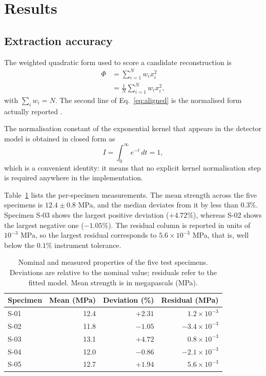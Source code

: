 \documentclass[10pt,twocolumn,a4paper]{article}
\begin{document}
\section{Results}
\label{sec:results}

\subsection{Extraction accuracy}

The weighted quadratic form used to score a candidate reconstruction is
\begin{equation}
\label{eq:aligned}
\begin{aligned}
\Phi &= \sum_{i=1}^{N} w_i x_i^{2} \\
     &= \frac{1}{N} \sum_{i=1}^{N} w_i x_i^{2} ,
\end{aligned}
\end{equation}
with $\sum_i w_i = N$. The second line of Eq.~\eqref{eq:aligned} is the
normalised form actually reported \cite{ref5}.

The normalisation constant of the exponential kernel that appears in the
detector model is obtained in closed form as
\begin{equation}
\label{eq:integral}
I = \int_{0}^{\infty} e^{-t}\,dt = 1 ,
\end{equation}
which is a convenient identity: it means that no explicit kernel
normalisation step is required anywhere in the implementation.

Table~\ref{tab:summary} lists the per-specimen measurements. The mean
strength across the five specimens is $12.4 \pm 0.8$ MPa, and the median
deviates from it by less than $0.3\%$. Specimen S-03 shows the largest
positive deviation ($+4.72\%$), whereas S-02 shows the largest negative one
($-1.05\%$). The residual column is reported in units of $10^{-3}$ MPa, so
the largest residual corresponds to $5.6 \times 10^{-3}$ MPa, that is, well
below the $0.1\%$ instrument tolerance.

\begin{table}[t]
\centering
\caption{Nominal and measured properties of the five test specimens.
Deviations are relative to the nominal value; residuals refer to the fitted
model. Mean strength is in megapascals (MPa).}
\label{tab:summary}
\footnotesize
\setlength{\tabcolsep}{3.5pt}
\begin{tabular}{@{}lrrr@{}}
\toprule
Specimen & Mean (MPa) & Deviation (\%) & Residual (MPa) \\
\midrule
S-01 & 12.4 & $+2.31$              & $1.2\times10^{-3}$  \\
S-02 & 11.8 & $-1.05$              & $-3.4\times10^{-3}$ \\
S-03 & 13.1 & $+4.72$              & $0.8\times10^{-3}$  \\
S-04 & 12.0 & $-0.86$              & $-2.1\times10^{-3}$ \\
S-05 & 12.7 & $+1.94$              & $5.6\times10^{-3}$  \\
\bottomrule
\end{tabular}
\end{table}
\end{document}

